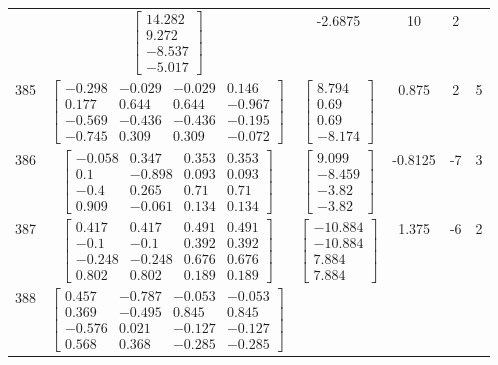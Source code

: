 \documentclass[a4paper,12pt]{article}
\begin{document}
\begin{tabular}{c c c c c c}
&
$\begin{bmatrix} 14.282 \\ 9.272 \\ -8.537 \\ -5.017 \end{bmatrix}$
&
-2.6875
&
10
&
2
\\
385
&
$\begin{bmatrix} -0.298 & -0.029 & -0.029 & 0.146 \\ 0.177 & 0.644 & 0.644 & -0.967 \\ -0.569 & -0.436 & -0.436 & -0.195 \\ -0.745 & 0.309 & 0.309 & -0.072 \end{bmatrix}$
&
$\begin{bmatrix} 8.794 \\ 0.69 \\ 0.69 \\ -8.174 \end{bmatrix}$
&
0.875
&
2
&
5
\\
386
&
$\begin{bmatrix} -0.058 & 0.347 & 0.353 & 0.353 \\ 0.1 & -0.898 & 0.093 & 0.093 \\ -0.4 & 0.265 & 0.71 & 0.71 \\ 0.909 & -0.061 & 0.134 & 0.134 \end{bmatrix}$
&
$\begin{bmatrix} 9.099 \\ -8.459 \\ -3.82 \\ -3.82 \end{bmatrix}$
&
-0.8125
&
-7
&
3
\\
387
&
$\begin{bmatrix} 0.417 & 0.417 & 0.491 & 0.491 \\ -0.1 & -0.1 & 0.392 & 0.392 \\ -0.248 & -0.248 & 0.676 & 0.676 \\ 0.802 & 0.802 & 0.189 & 0.189 \end{bmatrix}$
&
$\begin{bmatrix} -10.884 \\ -10.884 \\ 7.884 \\ 7.884 \end{bmatrix}$
&
1.375
&
-6
&
2
\\
388
&
$\begin{bmatrix} 0.457 & -0.787 & -0.053 & -0.053 \\ 0.369 & -0.495 & 0.845 & 0.845 \\ -0.576 & 0.021 & -0.127 & -0.127 \\ 0.568 & 0.368 & -0.285 & -0.285 \end{bmatrix}$

\end{tabular}
\end{document}

